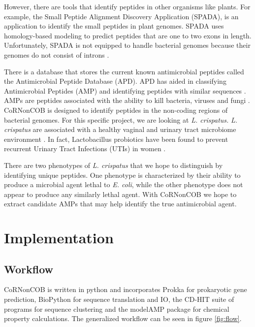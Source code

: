 \documentclass{article}
\begin{document}
 However, there are tools that identify peptides in other organisms like plants. For example, the Small Peptide Alignment Discovery Application (SPADA), is an application to identify the small peptides in plant genomes. SPADA uses homology-based modeling to predict peptides that are one to two exons in length. Unfortunately, SPADA is not equipped to handle bacterial genomes because their genomes do not consist of introns \cite{zhou_silverstein_gao_walton_nallu_guhlin_young_2013}.


There is a database that stores the current known antimicrobial peptides called the Antimicrobial Peptide Database (APD). APD has aided in classifying Antimicrobial Peptides (AMP) and identifying peptides with similar sequences \cite{wang_2004}. AMPs are peptides associated with the ability to kill bacteria, viruses and fungi \cite{izadpanah}. CoRNonCOB is designed to identify peptides in the non-coding regions of bacterial genomes. For this specific project, we are looking at \emph{L. crispatus.} \emph{L. crispatus} are associated with a healthy vaginal and urinary tract microbiome environment \cite{becknell_spencer_2015}. In fact, Lactobacillus probiotics have been found to prevent recurrent Urinary Tract Infections (UTIs) in women \cite{dwyer_dwyer_2012}.


There are two phenotypes of \emph{L. crispatus} that we hope to distinguish by identifying unique peptides. One phenotype is characterized by their ability to produce a microbial agent lethal to \emph{E. coli}, while the other phenotype does not appear to produce any similarly lethal agent. With CoRNonCOB we hope to extract candidate AMPs that may help identify the true antimicrobial agent.


\section{Implementation}

\subsection{Workflow}
CoRNonCOB is written in python and incorporates Prokka for prokaryotic gene prediction, BioPython for sequence translation and IO, the CD-HIT suite of programs for sequence clustering and the modelAMP package for chemical property
calculations. The generalized workflow can be seen in figure \ref{fig:flow}.
\end{document}
